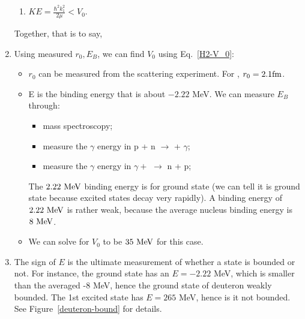 \documentclass{school-22.101-notes}
\begin{document}
\begin{enumerate}
\begin{enumerate}
\item $KE = \frac{\hbar^2 k_1^2}{2 \mu} < V_0$. 
\end{enumerate}
Together, that is to say,

\item Using measured $r_0, E_B$, we can find $V_0$ using Eq.~\ref{H2-V_0}:
\begin{itemize}
\item $r_0$ can be measured from the scattering experiment. For , $r_0 = 2.1 \mathrm{fm}$. 
\item E is the binding energy that is about $-2.22$ MeV. We can measure $E_B$ through: 
    \begin{itemize}
    \item mass spectroscopy;
    \item measure the $\gamma$ energy in p + n $\to$  + $\gamma$;
    \item measure the $\gamma$ energy in $\gamma +$  $\to$ n + p;
    \end{itemize}
    The $2.22 \mbox{ } \mathrm{MeV}$ binding energy is for ground state  (we can tell it is ground state because excited states decay very rapidly). A binding energy of $2.22 \mbox{ } \mathrm{MeV}$ is rather weak, because the average nucleus binding energy is $8 \mbox{ } \mathrm{MeV}$. 

\item We can solve for $V_0$ to be $35 \mbox{ } \mathrm{MeV}$ for this case.
\end{itemize}


\item The sign of $E$ is the ultimate measurement of whether a state is bounded or not. For instance, the ground state has an $E = -2.22 $ MeV, which is smaller than the averaged -8 MeV, hence the ground state of deuteron weakly bounded. The 1st excited state has $E = 265$ MeV, hence is it not bounded. See Figure~\ref{deuteron-bound} for details. 


\end{enumerate}
\end{document}
